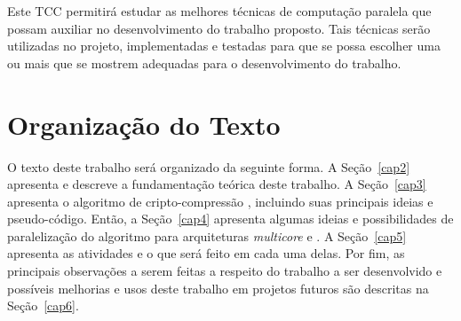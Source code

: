 Este TCC permitirá estudar as melhores técnicas de computação paralela que possam auxiliar no desenvolvimento do trabalho proposto. Tais técnicas serão utilizadas no projeto, implementadas e testadas para que se possa escolher uma ou mais que se mostrem adequadas para o desenvolvimento do trabalho.

\section{Organização do Texto}

O texto deste trabalho será organizado da seguinte forma. A Seção~\ref{cap2} apresenta e descreve a fundamentação teórica deste trabalho. A Seção~\ref{cap3} apresenta o algoritmo de cripto-compressão \gmpr, incluindo suas principais ideias e pseudo-código. Então, a Seção~\ref{cap4} apresenta algumas ideias e possibilidades de paralelização do algoritmo \gmpr para arquiteturas \textit{multicore} e \gpus. A Seção~\ref{cap5} apresenta as atividades e o que será feito em cada uma delas. Por fim, as principais observações a serem feitas a respeito do trabalho a ser desenvolvido e possíveis melhorias e usos deste trabalho em projetos futuros são descritas na Seção~\ref{cap6}.
